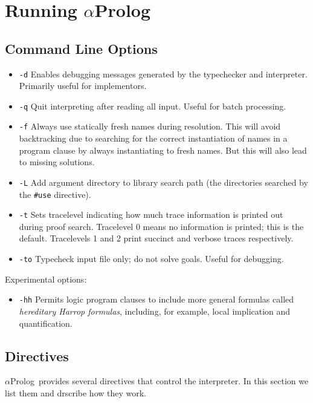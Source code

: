 \documentclass[draft,12pt]{report}
\newcommand{\aprolog}{$\alpha${Prolog}\xspace}
\begin{document}
\chapter{Running \aprolog}
\section{Command Line Options}

\begin{itemize}
\item {\tt -d} Enables debugging messages generated by the typechecker
  and interpreter.  Primarily useful for implementors.
\item {\tt -q} Quit interpreting after reading all input.  Useful for
  batch processing.
\item {\tt -f} Always use statically fresh names during resolution.
  This will avoid backtracking due to searching for the correct
  instantiation of names in a program clause by always instantiating
  to fresh names.  But this will also lead to missing solutions.
  
\item {\tt -L} Add argument directory to library search path (the
  directories searched by the {\tt \#use} directive).
  
\item {\tt -t} Sets tracelevel indicating how much trace information
  is printed out during proof search.  Tracelevel 0 means no
  information is printed; this is the default.  Tracelevels 1 and 2
  print succinct and verbose traces respectively.
\item {\tt -to} Typecheck input file only; do not solve goals.  Useful
  for debugging.
\end{itemize}

Experimental options:
\begin{itemize}
\item {\tt -hh} Permits logic program clauses to include more general
  formulas called \emph{hereditary Harrop formulas}, including, for
  example, local implication and quantification.

\end{itemize}

\section{Directives}
 
\aprolog\ provides several directives that control the interpreter.
In this section we list them and drscribe how they work.
\end{document}
